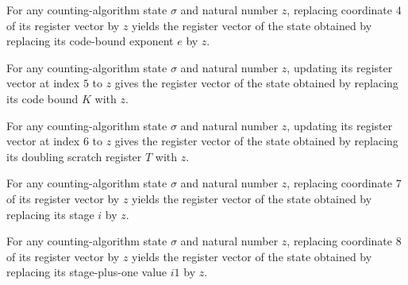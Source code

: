 \begin{lemma}
\label{Complexity.LogProg.ISCount.St.upd_e}
\leanok
{}
For any counting-algorithm state $\sigma$ and natural number $z$, replacing coordinate
$4$ of its register vector by $z$ yields the register vector of the state obtained by
replacing its code-bound exponent $e$ by $z$.
\end{lemma}

\begin{lemma}
\label{Complexity.LogProg.ISCount.St.upd_K}
\leanok
{}
For any counting-algorithm state $\sigma$ and natural number $z$, updating its register
vector at index $5$ to $z$ gives the register vector of the state obtained by replacing
its code bound $K$ with $z$.
\end{lemma}

\begin{lemma}
\label{Complexity.LogProg.ISCount.St.upd_T}
\leanok
{}
For any counting-algorithm state $\sigma$ and natural number $z$, updating its register
vector at index $6$ to $z$ gives the register vector of the state obtained by replacing
its doubling scratch register $T$ with $z$.
\end{lemma}

\begin{lemma}
\label{Complexity.LogProg.ISCount.St.upd_i}
\leanok
{}
For any counting-algorithm state $\sigma$ and natural number $z$, replacing coordinate
$7$ of its register vector by $z$ yields the register vector of the state obtained by
replacing its stage $i$ by $z$.
\end{lemma}

\begin{lemma}
\label{Complexity.LogProg.ISCount.St.upd_i1}
\leanok
{}
For any counting-algorithm state $\sigma$ and natural number $z$, replacing coordinate
$8$ of its register vector by $z$ yields the register vector of the state obtained by
replacing its stage-plus-one value $i1$ by $z$.
\end{lemma}

